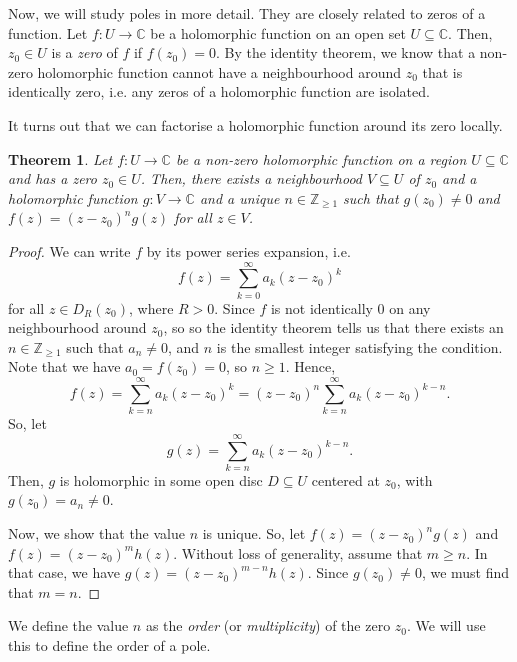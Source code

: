 \documentclass[a4paper, openany]{memoir}
\theoremstyle{definition}
\theoremstyle{plain}
\newtheorem{theorem}[definition]{Theorem}
\begin{document}
    Now, we will study poles in more detail. They are closely related to zeros of a function. Let $f \colon U \to \mathbb{C}$ be a holomorphic function on an open set $U \subseteq \mathbb{C}$. Then, $z_0 \in U$ is a \emph{zero} of $f$ if $f(z_0) = 0$. By the identity theorem, we know that a non-zero holomorphic function cannot have a neighbourhood around $z_0$ that is identically zero, i.e. any zeros of a holomorphic function are isolated. 
    
    It turns out that we can factorise a holomorphic function around its zero locally.
    \begin{theorem}
        Let $f \colon U \to \mathbb{C}$ be a non-zero holomorphic function on a region $U \subseteq \mathbb{C}$ and has a zero $z_0 \in U$. Then, there exists a neighbourhood $V \subseteq U$ of $z_0$ and a holomorphic function $g \colon V \to \mathbb{C}$ and a unique $n \in \mathbb{Z}_{\geq 1}$ such that $g(z_0) \neq 0$ and $f(z) = (z - z_0)^n g(z)$ for all $z \in V$.
    \end{theorem}
    \begin{proof}
        We can write $f$ by its power series expansion, i.e.
        \[f(z) = \sum_{k=0}^\infty a_k (z - z_0)^k\]
        for all $z \in D_R(z_0)$, where $R > 0$. Since $f$ is not identically 0 on any neighbourhood around $z_0$, so  so the identity theorem tells us that there exists an $n \in \mathbb{Z}_{\geq 1}$ such that $a_n \neq 0$, and $n$ is the smallest integer satisfying the condition. Note that we have $a_0 = f(z_0) = 0$, so $n \geq 1$. Hence,
        \[f(z) = \sum_{k=n}^\infty a_k(z - z_0)^k = (z - z_0)^n \sum_{k=n}^\infty a_k(z - z_0)^{k-n}.\]
        So, let
        \[g(z) = \sum_{k=n}^\infty a_k(z - z_0)^{k-n}.\]
        Then, $g$ is holomorphic in some open disc $D \subseteq U$ centered at $z_0$, with $g(z_0) = a_n \neq 0$.

        Now, we show that the value $n$ is unique. So, let $f(z) = (z - z_0)^n g(z)$ and $f(z) = (z - z_0)^m h(z)$. Without loss of generality, assume that $m \geq n$. In that case, we have $g(z) = (z - z_0)^{m-n} h(z)$. Since $g(z_0) \neq 0$, we must find that $m = n$.
    \end{proof}
    \noindent We define the value $n$ as the \emph{order} (or \emph{multiplicity}) of the zero $z_0$. We will use this to define the order of a pole. 
    
\end{document}
